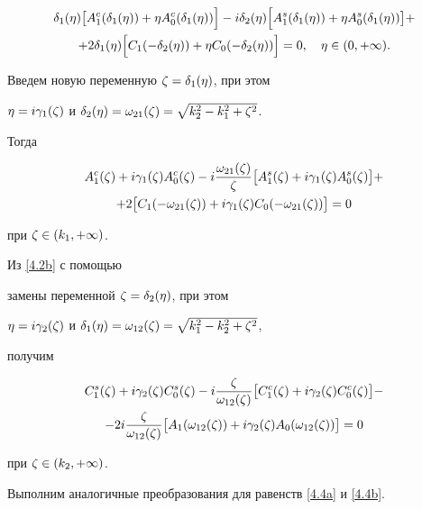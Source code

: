 \begin{multline*}


\defet \bigl[ \Acf(\defet)+\et \Acz(\defet) \Bigr]


-i \deset \Bigl[ \Asf(\defet)+\et \Asz(\defet) \bigr]+ \\


+2\defet \Bigl[ C_1(-\deset)+\et C_0(-\deset) \Bigr] = 0,


\quad \et\in(0,+\infty) .


\end{multline*}


Введем новую переменную $\zeta=\delta_1(\eta)$, при этом


$\eta=i \gamma_1(\zeta)$ и $\delta_2(\eta)=\omega_{21}(\zeta)=\sqrt{k_2^2-k_1^2+\zeta^2}$.


Тогда


\begin{multline}\label{4.7a}


\Acf(\dz)+i \gafdz \Acz(\dz)


-i \frac{\omsfdz}{\dz} 


\bigl[ \Asf(\dz)+i \gafdz \Asz(\dz) \bigr]+ \\


+2 \bigl[ C_1(-\omsfdz)+i \gafdz C_0(-\omsfdz) \bigr] = 0


\end{multline}


при $\zeta\in(k_1,+\infty)$.


Из \eqref{4.2b} с помощью


замены переменной $\zeta=\delta_2(\eta)$, при этом


$\eta=i \gamma_2(\zeta)$ и $\delta_1(\eta)=\omega_{12}(\zeta)=\sqrt{k_1^2-k_2^2+\zeta^2}$,


получим


\begin{multline}\label{4.7b}


\Csf(\dz)+i \gasdz \Csz(\dz)


-i \frac{\dz}{\omfsdz} 


\bigl[ \Ccf(\dz)+i \gasdz \Ccz(\dz) \bigr]- \\


-2i \frac{\dz}{\omfsdz} 


\bigl[ A_1(\omfsdz)+i \gasdz A_0(\omfsdz) \bigr] = 0


\end{multline}


при $\zeta\in(k_2,+\infty)$.





Выполним аналогичные преобразования для равенств \eqref{4.4a} и \eqref{4.4b}.


